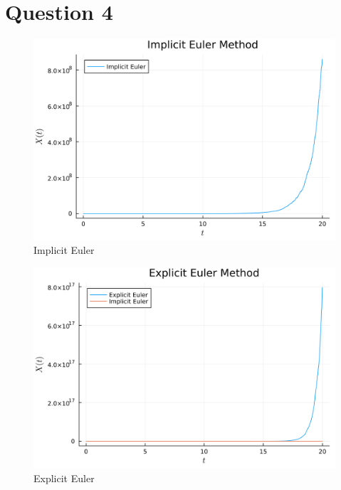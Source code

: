 \documentclass{article}
\begin{document}
\section*{Question 4}
\begin{figure}[H]
    \centering
    \includegraphics[scale=0.05]{imgs/4implicit_euler.png}
    \caption{Implicit Euler}
    \label{fig:impliciteuler}
\end{figure}

\begin{figure}[H]
    \centering
    \includegraphics[scale=0.05]{imgs/4explicit_euler.png}
    \caption{Explicit Euler}
    \label{fig:expliciteuler}
\end{figure}
\end{document}

